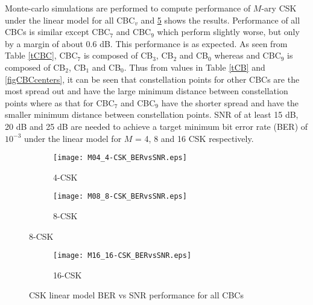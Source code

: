 Monte-carlo simulations are performed to compute performance of $M$-ary CSK under the linear model for all CBC$_{v}$ and \figurename{ }\ref{figBERvsSNR} shows the results. Performance of all CBCs is similar except CBC$_{7}$ and CBC$_{9}$ which perform slightly worse, but only by a margin of about 0.6 dB. This performance is as expected. As seen from Table \ref{tCBC}, CBC$_{7}$ is composed of CB$_{3}$, CB$_{2}$ and CB$_{0}$ whereas and CBC$_{9}$ is composed of CB$_{2}$, CB$_{1}$ and CB$_{0}$. Thus from values in Table \ref{tCB} and \figurename{ }\ref{figCBCcenters}, it can be seen that constellation points for other CBCs are the most spread out and have the large minimum distance between constellation points where as that for CBC$_{7}$ and CBC$_{9}$ have the shorter spread and have the smaller minimum distance between constellation points. SNR of at least 15 dB, 20 dB and 25 dB are needed to achieve a target minimum bit error rate (BER) of $10^{-3}$ under the linear model for $M$ = 4, 8 and 16 CSK respectively.

\begin{figure}[H]
	\centering
		\begin{subfigure}{\textwidth}
		\centering
			\texttt{[image: M04\_4-CSK\_BERvsSNR.eps]}
			\caption{4-CSK}
			\label{fig4SNR}
		\end{subfigure}
		\begin{subfigure}{\textwidth}
		\centering
			\texttt{[image: M08\_8-CSK\_BERvsSNR.eps]}
			\caption{8-CSK}
			\label{fig8SNR}
		\end{subfigure}
\end{figure}
\begin{figure}[H]
	\ContinuedFloat
		\begin{subfigure}{\textwidth}
		\centering
			\texttt{[image: M16\_16-CSK\_BERvsSNR.eps]}
			\caption{16-CSK}
			\label{fig16SNR}
		\end{subfigure}
	\caption{CSK linear model BER vs SNR performance for all CBCs}
	\label{figBERvsSNR}
\end{figure}

